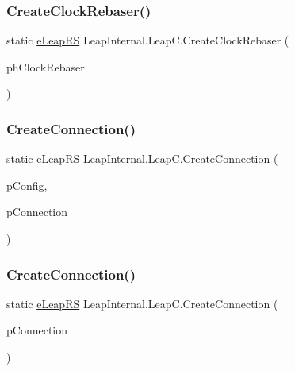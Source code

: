 \subsubsection{\texorpdfstring{CreateClockRebaser()}{CreateClockRebaser()}}
{\footnotesize\ttfamily static \mbox{\hyperlink{namespace_leap_internal_ae50b07d24c508b84273392b6dcbea1d9}{e\+Leap\+RS}} Leap\+Internal.\+Leap\+C.\+Create\+Clock\+Rebaser (\begin{DoxyParamCaption}\item[{out Int\+Ptr}]{ph\+Clock\+Rebaser }\end{DoxyParamCaption})}

\mbox{\label{class_leap_internal_1_1_leap_c_a2a35287387889d78359ce9d0965fa706}} 
\subsubsection{\texorpdfstring{CreateConnection()}{CreateConnection()}\hspace{0.1cm}{\footnotesize\ttfamily [1/2]}}
{\footnotesize\ttfamily static \mbox{\hyperlink{namespace_leap_internal_ae50b07d24c508b84273392b6dcbea1d9}{e\+Leap\+RS}} Leap\+Internal.\+Leap\+C.\+Create\+Connection (\begin{DoxyParamCaption}\item[{ref \mbox{\hyperlink{struct_leap_internal_1_1_l_e_a_p___c_o_n_n_e_c_t_i_o_n___c_o_n_f_i_g}{L\+E\+A\+P\+\_\+\+C\+O\+N\+N\+E\+C\+T\+I\+O\+N\+\_\+\+C\+O\+N\+F\+IG}}}]{p\+Config,  }\item[{out Int\+Ptr}]{p\+Connection }\end{DoxyParamCaption})}

\mbox{\label{class_leap_internal_1_1_leap_c_a6f1283109b988f2358c4c292004a3af1}} 
\subsubsection{\texorpdfstring{CreateConnection()}{CreateConnection()}\hspace{0.1cm}{\footnotesize\ttfamily [2/2]}}
{\footnotesize\ttfamily static \mbox{\hyperlink{namespace_leap_internal_ae50b07d24c508b84273392b6dcbea1d9}{e\+Leap\+RS}} Leap\+Internal.\+Leap\+C.\+Create\+Connection (\begin{DoxyParamCaption}\item[{out Int\+Ptr}]{p\+Connection }\end{DoxyParamCaption})\hspace{0.3cm}{\ttfamily [static]}}



